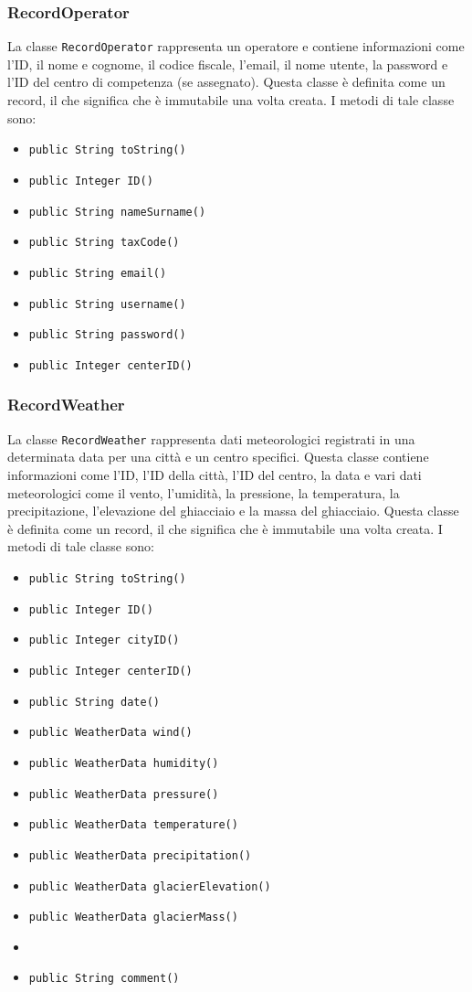 \subsubsection{RecordOperator}
La classe \texttt{RecordOperator} rappresenta un operatore e contiene informazioni come l'ID, il nome e cognome, il codice fiscale, l'email, il nome utente, la password e l'ID del centro di competenza (se assegnato).
Questa classe è definita come un record, il che significa che è immutabile una volta creata.
I metodi di tale classe sono:
\begin{itemize}
\item \texttt{public String toString()}
\item \texttt{public Integer ID()}
\item \texttt{public String nameSurname()}
\item \texttt{public String taxCode()}
\item \texttt{public String email()}
\item \texttt{public String username()}
\item \texttt{public String password()}
\item \texttt{public Integer centerID()}
\end{itemize}

\subsubsection{RecordWeather}
La classe \texttt{RecordWeather} rappresenta dati meteorologici registrati in una determinata data per una città e un centro specifici.
Questa classe contiene informazioni come l'ID, l'ID della città, l'ID del centro, la data e vari dati meteorologici come il vento, l'umidità, la pressione, la temperatura, la precipitazione, l'elevazione del ghiacciaio e la massa del ghiacciaio.
Questa classe è definita come un record, il che significa che è immutabile una volta creata.
I metodi di tale classe sono:
\begin{itemize}
\item \texttt{public String toString()}
\item \texttt{public Integer ID()}
\item \texttt{public Integer cityID()}
\item \texttt{public Integer centerID()}
\item \texttt{public String date()}
\item \texttt{public WeatherData wind()}
\item \texttt{public WeatherData humidity()}
\item \texttt{public WeatherData pressure()}
\item \texttt{public WeatherData temperature()}
\item \texttt{public WeatherData precipitation()}
\item \texttt{public WeatherData glacierElevation()}
\item \texttt{public WeatherData glacierMass()}
\item {}
\item \texttt{public String comment()}
\end{itemize}

